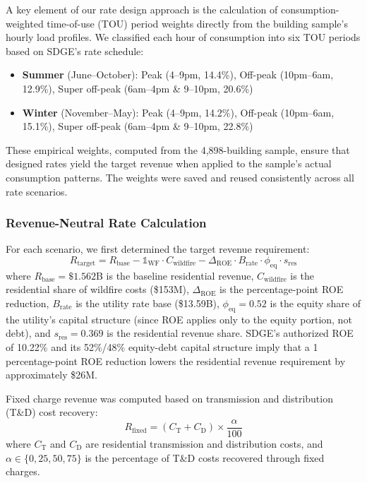 \documentclass[12pt]{article}
\begin{document}
A key element of our rate design approach is the calculation of consumption-weighted time-of-use (TOU) period weights directly from the building sample's hourly load profiles. We classified each hour of consumption into six TOU periods based on SDGE's rate schedule:
\begin{itemize}
    \item \textbf{Summer} (June--October): Peak (4--9pm, 14.4\%), Off-peak (10pm--6am, 12.9\%), Super off-peak (6am--4pm \& 9--10pm, 20.6\%)
    \item \textbf{Winter} (November--May): Peak (4--9pm, 14.2\%), Off-peak (10pm--6am, 15.1\%), Super off-peak (6am--4pm \& 9--10pm, 22.8\%)
\end{itemize}
These empirical weights, computed from the 4,898-building sample, ensure that designed rates yield the target revenue when applied to the sample's actual consumption patterns. The weights were saved and reused consistently across all rate scenarios.

\subsubsection{Revenue-Neutral Rate Calculation}

For each scenario, we first determined the target revenue requirement:
\begin{equation}
R_{\text{target}} = R_{\text{base}} - \mathbb{1}_{\text{WF}} \cdot C_{\text{wildfire}} - \Delta_{\text{ROE}} \cdot B_{\text{rate}} \cdot \phi_{\text{eq}} \cdot s_{\text{res}}
\end{equation}
where $R_{\text{base}} = \$1.562$B is the baseline residential revenue, $C_{\text{wildfire}}$ is the residential share of wildfire costs (\$153M), $\Delta_{\text{ROE}}$ is the percentage-point ROE reduction, $B_{\text{rate}}$ is the utility rate base (\$13.59B), $\phi_{\text{eq}} = 0.52$ is the equity share of the utility's capital structure (since ROE applies only to the equity portion, not debt), and $s_{\text{res}} = 0.369$ is the residential revenue share. SDGE's authorized ROE of 10.22\% and its 52\%/48\% equity-debt capital structure imply that a 1 percentage-point ROE reduction lowers the residential revenue requirement by approximately \$26M.

Fixed charge revenue was computed based on transmission and distribution (T\&D) cost recovery:
\begin{equation}
R_{\text{fixed}} = (C_{\text{T}} + C_{\text{D}}) \times \frac{\alpha}{100}
\end{equation}
where $C_{\text{T}}$ and $C_{\text{D}}$ are residential transmission and distribution costs, and $\alpha \in \{0, 25, 50, 75\}$ is the percentage of T\&D costs recovered through fixed charges.
\end{document}
